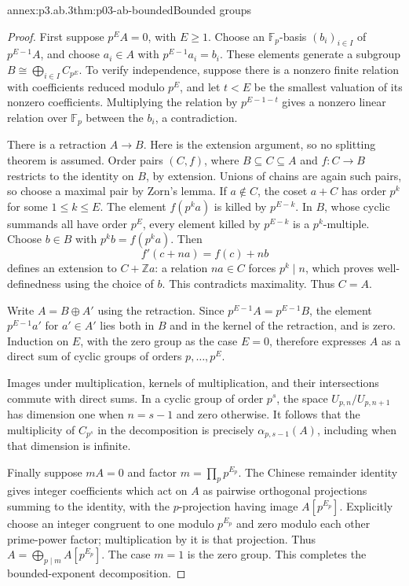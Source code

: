 \begin{annexitem}{annex:p3.ab.3}{thm:p03-ab-bounded}{Bounded groups}
\begin{proof}
First suppose \(p^E A=0\), with \(E\geq1\). Choose an
\(\mathbb F_p\)-basis \((b_i)_{i\in I}\) of \(p^{E-1}A\), and choose
\(a_i\in A\) with \(p^{E-1}a_i=b_i\). These elements generate a subgroup
\(B\cong\bigoplus_{i\in I}C_{p^E}\). To verify independence, suppose
there is a nonzero finite relation with coefficients reduced modulo
\(p^E\), and let \(t<E\) be the smallest valuation of its nonzero
coefficients. Multiplying the relation by \(p^{E-1-t}\) gives a nonzero
linear relation over \(\mathbb F_p\) between the \(b_i\), a contradiction.

There is a retraction \(A\longrightarrow B\). Here is the extension
argument, so no splitting theorem is assumed. Order pairs \((C,f)\),
where \(B\subseteq C\subseteq A\) and \(f:C\longrightarrow B\) restricts
to the identity on \(B\), by extension. Unions of chains are again such
pairs, so choose a maximal pair by Zorn's lemma. If \(a\notin C\), the
coset \(a+C\) has order \(p^k\) for some \(1\leq k\leq E\). The element
\(f(p^ka)\) is killed by \(p^{E-k}\). In \(B\), whose cyclic summands
all have order \(p^E\), every element killed by \(p^{E-k}\) is a
\(p^k\)-multiple. Choose \(b\in B\) with \(p^kb=f(p^ka)\). Then
\[
 f'(c+na)=f(c)+nb
\]
defines an extension to \(C+\mathbb Za\): a relation \(na\in C\)
forces \(p^k\mid n\), which proves well-definedness using the choice
of \(b\). This contradicts maximality. Thus \(C=A\).

Write \(A=B\oplus A'\) using the retraction. Since
\(p^{E-1}A=p^{E-1}B\), the element \(p^{E-1}a'\) for \(a'\in A'\)
lies both in \(B\) and in the kernel of the retraction, and is zero.
Induction on \(E\), with the zero group as the case \(E=0\), therefore
expresses \(A\) as a direct sum of cyclic groups of orders
\(p,\ldots,p^E\).

Images under multiplication, kernels of multiplication, and their
intersections commute with direct sums. In a cyclic group of order
\(p^s\), the space \(U_{p,n}/U_{p,n+1}\) has dimension one when
\(n=s-1\) and zero otherwise. It follows that the multiplicity of
\(C_{p^s}\) in the decomposition is precisely \(\alpha_{p,s-1}(A)\),
including when that dimension is infinite.

Finally suppose \(mA=0\) and factor \(m=\prod_p p^{E_p}\). The Chinese
remainder identity gives integer coefficients which act on \(A\) as
pairwise orthogonal projections summing to the identity, with the
\(p\)-projection having image \(A[p^{E_p}]\). Explicitly choose an
integer congruent to one modulo \(p^{E_p}\) and zero modulo each other
prime-power factor; multiplication by it is that projection. Thus
\(A=\bigoplus_{p\mid m}A[p^{E_p}]\). The case \(m=1\) is the zero
group. This completes the bounded-exponent decomposition.
\end{proof}
\end{annexitem}


